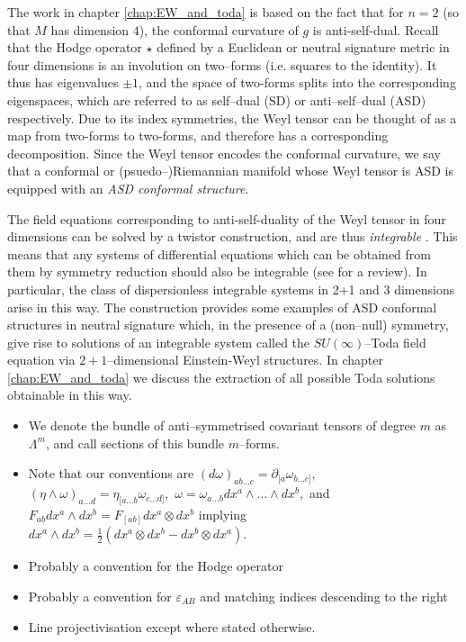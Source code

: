 The work in chapter \ref{chap:EW_and_toda} is based on the fact that for $n=2$ (so that $M$ has dimension $4$), the conformal
curvature of $g$ is anti-self-dual. Recall that the Hodge operator
$\star$ defined by a Euclidean or neutral signature metric in four
dimensions is an involution on two--forms (i.e. squares to the identity).
It thus has eigenvalues $\pm1$, and the space of two-forms splits
into the corresponding eigenspaces, which are referred to as self--dual
(SD) or anti--self--dual (ASD) respectively. Due to its index symmetries,
the Weyl tensor can be thought of as a map from two-forms to two-forms,
and therefore has a corresponding decomposition. Since the Weyl tensor
encodes the conformal curvature, we say that a conformal or (psuedo--)Riemannian
manifold whose Weyl tensor is ASD is equipped with an \textit{ASD
conformal structure}.

The field equations corresponding to anti-self-duality of the Weyl
tensor in four dimensions can be solved by a twistor construction,
and are thus \textit{integrable} \cite{ward}. This means that any systems of differential
equations which can be obtained from them by symmetry reduction should
also be integrable (see \cite{MW} for a review). In particular, the class of dispersionless
integrable systems in 2+1 and 3 dimensions arise in this way. The
construction \cite{DM} provides some examples of
ASD conformal structures in neutral signature which, in the presence
of a (non--null) symmetry, give rise to solutions of an integrable
system called the $SU(\infty)$--Toda field equation via $2+1$--dimensional
Einstein-Weyl structures. In chapter \ref{chap:EW_and_toda} we discuss the extraction
of all possible Toda solutions obtainable in this way.

\begin{itemize}
\item We denote the bundle of anti--symmetrised covariant tensors of degree $m$ as $\Lambda^m$, and call sections of this bundle $m$--forms.
\item Note that our conventions are $(d\omega)_{ab\dots c}=\partial_{[a}\omega_{b\dots c]},$
$(\eta\wedge\omega)_{a\dots d}=\eta_{[a\dots b}\omega_{c\dots d]},$
$\omega=\omega_{a\dots b}dx^{a}\wedge\dots\wedge dx^{b},$
and $F_{ab}{d}x^{a}\wedge{d}x^{b}=F_{[ab]}{d}x^{a}\otimes{d}x^{b}$
implying ${d}x^{a}\wedge{d}x^{b}=\frac{1}{2}({d}x^{a}\otimes{d}x^{b}-{d}x^{b}\otimes{d}x^{a})$.
\item Probably a convention for the Hodge operator
\item Probably a convention for $\varepsilon_{AB}$ and matching indices descending to the right
\item Line projectivisation except where stated otherwise.
\end{itemize}

